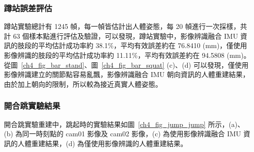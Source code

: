 \subsubsection*{蹲站誤差評估}
蹲站實驗總計有 1245 幀，每一幀皆估計出人體姿態，每 20 幀進行一次採樣，共計 63 個樣本點進行評估及驗證，可以發現，蹲站實驗中，影像辨識融合 IMU 資訊的肢段的平均估計成功率約 38.1\%，平均有效誤差約在 76.8410 (mm)，僅使用影像辨識的肢段的平均估計成功率約 11.11\%，平均有效誤差約在 94.5808 (mm)。從圖~\ref{ch4_fig_bar_stand}、圖~\ref{ch4_fig_bar_squat} (c)、(d) 可以發現，僅使用影像辨識建立的關節點容易亂飄，影像辨識融合 IMU 朝向資訊的人體重建結果，由於加上朝向的限制，所以較為接近真實人體姿態。

\clearpage

\subsubsection*{開合跳實驗結果}
開合跳實驗重建中，跳起時的實驗結果如圖~\ref{ch4_fig_jump_jump} 所示，(a)、(b) 為同一時刻點的 cam01 影像及 cam02 影像，(c) 為使用影像辨識融合 IMU 資訊的人體重建結果，(d) 為僅使用影像辨識的人體重建結果。

